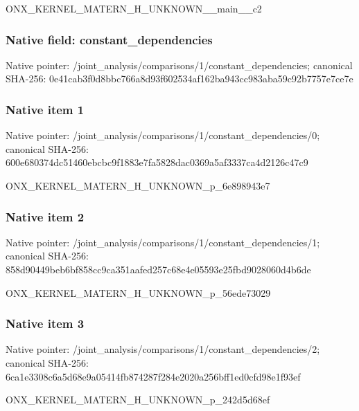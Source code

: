 \documentclass[10pt,a4paper]{article}
\begin{document}
\begingroup\raggedright\sloppy ONX\_\allowbreak{}KERNEL\_\allowbreak{}MATERN\_\allowbreak{}H\_\allowbreak{}UNKNOWN\_\allowbreak{}\_\allowbreak{}main\_\allowbreak{}\_\allowbreak{}c2\par\endgroup

\subsubsection{Native field: constant\_\allowbreak{}dependencies}
Native pointer: /joint\_\allowbreak{}analysis/comparisons/1/constant\_\allowbreak{}dependencies; canonical SHA-256: 0e41cab3f0d8bbc766a8d93f602534af162ba943cc983aba59c92b7757e7ce7e

\subsubsection{Native item 1}
Native pointer: /joint\_\allowbreak{}analysis/comparisons/1/constant\_\allowbreak{}dependencies/0; canonical SHA-256: 600e680374dc51460ebcbc9f1883e7fa5828dac0369a5af3337ca4d2126c47c9

\begingroup\raggedright\sloppy ONX\_\allowbreak{}KERNEL\_\allowbreak{}MATERN\_\allowbreak{}H\_\allowbreak{}UNKNOWN\_\allowbreak{}p\_\allowbreak{}6e898943e7\par\endgroup

\subsubsection{Native item 2}
Native pointer: /joint\_\allowbreak{}analysis/comparisons/1/constant\_\allowbreak{}dependencies/1; canonical SHA-256: 858d90449beb6bf858cc9ca351aafed257c68e4e05593e25fbd9028060d4b6de

\begingroup\raggedright\sloppy ONX\_\allowbreak{}KERNEL\_\allowbreak{}MATERN\_\allowbreak{}H\_\allowbreak{}UNKNOWN\_\allowbreak{}p\_\allowbreak{}56ede73029\par\endgroup

\subsubsection{Native item 3}
Native pointer: /joint\_\allowbreak{}analysis/comparisons/1/constant\_\allowbreak{}dependencies/2; canonical SHA-256: 6ca1e3308c6a5d68e9a05414fb874287f284e2020a256bff1ed0cfd98e1f93ef

\begingroup\raggedright\sloppy ONX\_\allowbreak{}KERNEL\_\allowbreak{}MATERN\_\allowbreak{}H\_\allowbreak{}UNKNOWN\_\allowbreak{}p\_\allowbreak{}242d5d68ef\par\endgroup
\end{document}
